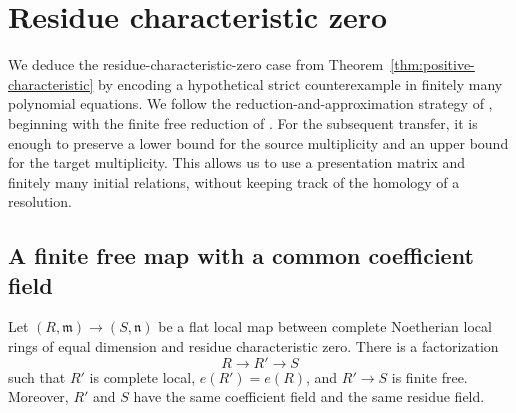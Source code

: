 \section{Residue characteristic zero}\label{sec:charzero}

We deduce the residue-characteristic-zero case from
Theorem~\ref{thm:positive-characteristic} by encoding a hypothetical
strict counterexample in finitely many polynomial equations. We follow
the reduction-and-approximation strategy of \cite[Section~5]{Ma},
beginning with the finite free reduction of \cite[Lemma~5.1]{Ma}.
For the subsequent transfer, it is enough to preserve a lower bound for
the source multiplicity and an upper bound for the target multiplicity. This
allows us to use a presentation matrix and finitely many initial
relations, without keeping track of the homology of a resolution.

\subsection{A finite free map with a common coefficient field}

\begin{lemma}\label{lem:charzero-finite-free}
Let $(R,\mathfrak m)\to(S,\mathfrak n)$ be a flat local map between
complete Noetherian local rings of equal dimension and residue
characteristic zero.  There is a factorization
\[
 R\longrightarrow R'\longrightarrow S
\]
such that $R'$ is complete local, $e(R')=e(R)$, and $R'\to S$ is finite
free.  Moreover, $R'$ and $S$ have the same coefficient field and the
same residue field.
\end{lemma}

